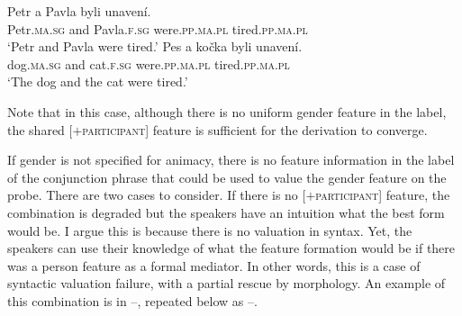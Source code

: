 \documentclass[output=paper,
modfonts
newtxmath,
hidelinks
]{langscibook}
\begin{document}
\ea\label{anim-2-rep}
\ea\gll Petr a Pavla byli unavení.\\
Petr.\textsc{ma.sg} and Pavla.\textsc{f.sg} were.\textsc{pp.ma.pl} tired.\textsc{pp.ma.pl}\\
\glt `Petr and Pavla were tired.'\smallskip
\ex\gll  Pes a kočka byli unavení.\\
dog.\textsc{ma.sg} and cat.\textsc{f.sg} were.\textsc{pp.ma.pl} tired.\textsc{pp.ma.pl}\\
\glt `The dog and the cat were tired.'\\
\z
\hfill {}
\z


\noindent Note that in this case, although there is no uniform gender feature in the label, the shared [$+$\textsc{participant}] feature is sufficient for the derivation to converge.

If gender is not specified for animacy, there is no feature information in the label of the conjunction phrase that could be used to value the gender feature on the probe. There are two cases to consider. If there is no [$+$\textsc{participant}] feature, the combination is degraded but the speakers have an intuition what the best form would be. I argue this is because there is no valuation in syntax. Yet, the speakers can use their knowledge of what the feature formation would be if there was a person feature as a formal mediator. In other words, this is a case of syntactic valuation failure, with a partial rescue by morphology. An example of this combination is in --, repeated below as --.


\z

\z


\z
\end{document}
